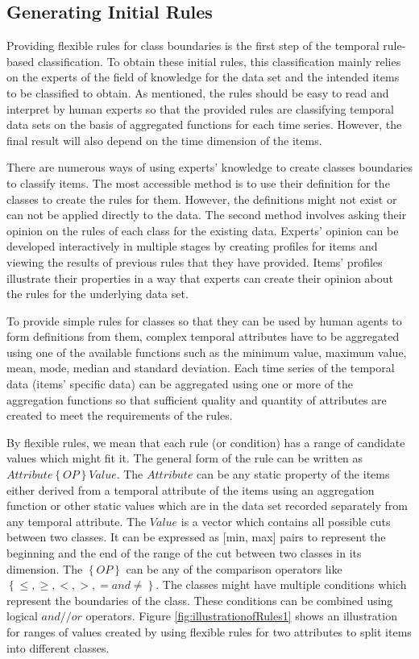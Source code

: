 \subsection{Generating Initial Rules}
\label{sec:Generating-Initial-Rules}
Providing flexible rules for class boundaries is the first step of the temporal rule-based classification. To obtain these initial rules, this classification mainly relies on the experts of the field of knowledge for the data set and the intended items to be classified to obtain. As mentioned, the rules should be easy to read and interpret by human experts so that the provided rules are classifying temporal data sets on the basis of aggregated functions for each time series. However, the final result will also depend on the time dimension of the items.

There are numerous ways of using experts' knowledge to create classes boundaries to classify items. The most accessible method is to use their definition for the classes to create the rules for them. However, the definitions might not exist or can not be applied directly to the data. The second method involves asking their opinion on the rules of each class for the existing data. Experts' opinion can be developed interactively in multiple stages by creating profiles for items and viewing the results of previous rules that they have provided. Items' profiles illustrate their properties in a way that experts can create their opinion about the rules for the underlying data set.

To provide simple rules for classes so that they can be used by human agents to form definitions from them, complex temporal attributes have to be aggregated using one of the available functions such as the minimum value, maximum value, mean, mode, median and standard deviation. Each time series of the temporal data (items' specific data) can be aggregated using one or more of the aggregation functions so that sufficient quality and quantity of attributes are created to meet the requirements of the rules.

By flexible rules, we mean that each rule (or condition) has a range of candidate values which might fit it. The general form of the rule can be written as \textbf{$Attribute \left \{OP\right \} Value$}. The $Attribute$ can be any static property of the items either derived from a temporal attribute of the items using an aggregation function or other static values which are in the data set recorded separately from any temporal attribute. The $Value$ is a vector which contains all possible cuts between two classes. It can be expressed as [min, max] pairs to represent the beginning and the end of the range of the cut between two classes in its dimension. The $ \left \{OP\right \} $ can be any of the comparison operators like $\left \{\leqslant , \geqslant , < , > , = and \neq \right \}$. The classes might have multiple conditions which represent the boundaries of the class. These conditions can be combined using logical $and//or$ operators. Figure \ref{fig:illustrationofRules1} shows an illustration for ranges of values created by using flexible rules for two attributes to split items into different classes.

